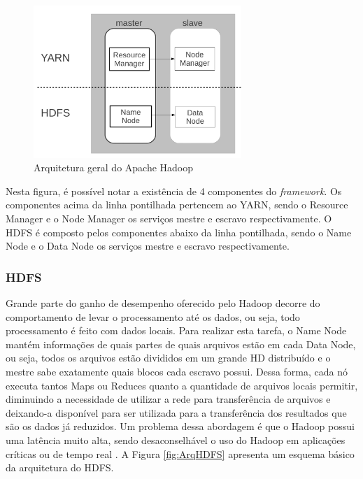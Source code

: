 \begin{figure}[!ht]
\centering
\includegraphics[width=0.7\textwidth]{figuras/Figura08-HadoooArchGeral.png}
\caption{Arquitetura geral do Apache Hadoop}
\label{fig:ArquiteturaHadoop}
\end{figure}

Nesta figura, é possível notar a existência de 4 componentes do \textit{framework}. Os componentes acima da linha pontilhada pertencem ao YARN, sendo o Resource Manager e o Node Manager os serviços mestre e escravo respectivamente. O HDFS é composto pelos componentes abaixo da linha pontilhada, sendo o Name Node e o Data Node os serviços mestre e escravo respectivamente.

\subsubsection{HDFS}
Grande parte do ganho de desempenho oferecido pelo Hadoop decorre do comportamento de levar o processamento até os dados, ou seja, todo processamento é feito com dados locais. Para realizar esta tarefa, o Name Node mantém informações de quais partes de quais arquivos estão em cada Data Node, ou seja, todos os arquivos estão divididos em um grande HD distribuído e o mestre sabe exatamente quais blocos cada escravo possui. Dessa forma, cada nó executa tantos Maps ou Reduces quanto a quantidade de arquivos locais permitir, diminuindo a necessidade de utilizar a rede para transferência de arquivos e deixando-a disponível para ser utilizada para a transferência dos resultados que são os dados já reduzidos. Um problema dessa abordagem é que o Hadoop possui uma latência muito alta, sendo desaconselhável o uso do Hadoop em aplicações críticas ou de tempo real \cite{BookHadoop}. A Figura \ref{fig:ArqHDFS} apresenta um esquema básico da arquitetura do HDFS.

